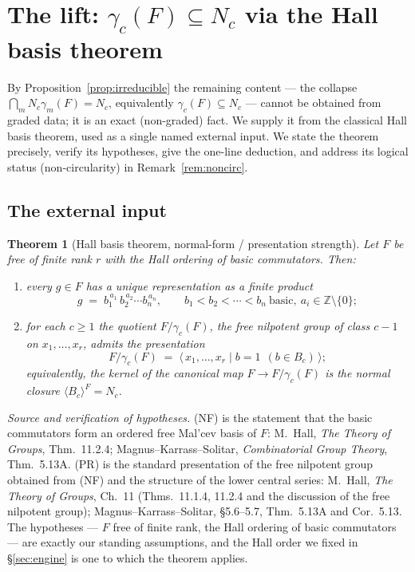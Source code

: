 \documentclass{amsart}
\newtheorem{theorem}{Theorem}
\theoremstyle{definition}
\theoremstyle{remark}
\begin{document}
\section{The lift: $\gamma_c(F)\subseteq N_c$ via the Hall basis theorem}\label{sec:lift}

By Proposition~\ref{prop:irreducible} the remaining content --- the collapse
$\bigcap_m N_c\gamma_m(F)=N_c$, equivalently $\gamma_c(F)\subseteq N_c$ --- cannot be
obtained from graded data; it is an exact (non-graded) fact. We supply it from the
classical Hall basis theorem, used as a single named external input. We state the
theorem precisely, verify its hypotheses, give the one-line deduction, and address its
logical status (non-circularity) in Remark~\ref{rem:noncirc}.

\subsection*{The external input}

\begin{theorem}[Hall basis theorem, normal-form / presentation strength]\label{thm:hall-nf}
Let $F$ be free of finite rank $r$ with the Hall ordering of basic commutators. Then:
\begin{enumerate}
\item[\textup{(NF)}] every $g\in F$ has a unique representation as a \emph{finite}
product
\begin{equation}\label{eq:normalform}
g\;=\;b_{1}^{\,a_{1}}\,b_{2}^{\,a_{2}}\cdots b_{n}^{\,a_{n}},
\qquad b_{1}<b_{2}<\cdots<b_{n}\ \text{basic},\ a_{i}\in\mathbb Z\setminus\{0\};
\end{equation}
\item[\textup{(PR)}] for each $c\ge1$ the quotient $F/\gamma_c(F)$, the free nilpotent
group of class $c-1$ on $x_1,\dots,x_r$, admits the presentation
\begin{equation}\label{eq:hallpres}
F/\gamma_c(F)\;=\;\big\langle\, x_1,\dots,x_r \;\big|\; b=1\ \ (b\in B_c)\,\big\rangle;
\end{equation}
equivalently, the kernel of the canonical map $F\to F/\gamma_c(F)$ is the normal
closure $\langle B_c\rangle^{F}=N_c$.
\end{enumerate}
\end{theorem}
\noindent\emph{Source and verification of hypotheses.} (NF) is the statement that the
basic commutators form an ordered free Mal'cev basis of $F$: M.~Hall, \emph{The Theory
of Groups}, Thm.~11.2.4; Magnus--Karrass--Solitar, \emph{Combinatorial Group Theory},
Thm.~5.13A. (PR) is the standard presentation of the free nilpotent group obtained
from (NF) and the structure of the lower central series: M.~Hall, \emph{The Theory of
Groups}, Ch.~11 (Thms.~11.1.4, 11.2.4 and the discussion of the free nilpotent group);
Magnus--Karrass--Solitar, \S5.6--5.7, Thm.~5.13A and Cor.~5.13. The hypotheses --- $F$
free of finite rank, the Hall ordering of basic commutators --- are exactly our
standing assumptions, and the Hall order we fixed in \S\ref{sec:engine} is one to which
the theorem applies.
\end{document}
